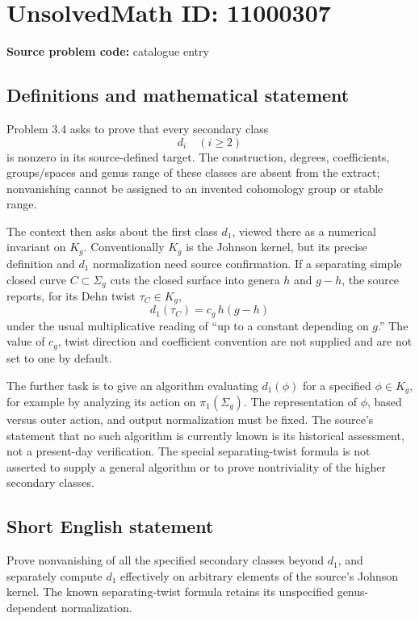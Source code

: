 \documentclass[11pt]{article}
\begin{document}
\section*{UnsolvedMath ID: 11000307}
\textbf{Source problem code:} catalogue entry
\subsection{Definitions and mathematical statement}
Problem 3.4 asks to prove that every secondary class
\[
 d_i\quad(i\ge2)
\]
is nonzero in its source-defined target. The construction, degrees, coefficients, groups/spaces and genus range of these classes are absent from the extract; nonvanishing cannot be assigned to an invented cohomology group or stable range.

The context then asks about the first class \(d_1\), viewed there as a numerical invariant on \(K_g\). Conventionally \(K_g\) is the Johnson kernel, but its precise definition and \(d_1\) normalization need source confirmation. If a separating simple closed curve \(C\subset\Sigma_g\) cuts the closed surface into genera \(h\) and \(g-h\), the source reports, for its Dehn twist \(\tau_C\in K_g\),
\[
 d_1(\tau_C)=c_g\,h(g-h)
\]
under the usual multiplicative reading of ``up to a constant depending on \(g\).'' The value of \(c_g\), twist direction and coefficient convention are not supplied and are not set to one by default.

The further task is to give an algorithm evaluating \(d_1(\phi)\) for a specified \(\phi\in K_g\), for example by analyzing its action on \(\pi_1(\Sigma_g)\). The representation of \(\phi\), based versus outer action, and output normalization must be fixed. The source's statement that no such algorithm is currently known is its historical assessment, not a present-day verification. The special separating-twist formula is not asserted to supply a general algorithm or to prove nontriviality of the higher secondary classes.
\subsection{Short English statement}
Prove nonvanishing of all the specified secondary classes beyond \(d_1\), and separately compute \(d_1\) effectively on arbitrary elements of the source's Johnson kernel. The known separating-twist formula retains its unspecified genus-dependent normalization.
\end{document}
